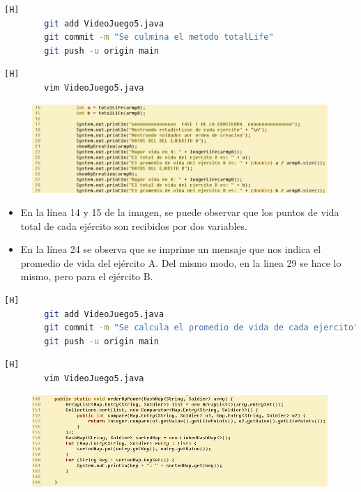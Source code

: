 \documentclass{article}
\begin{document}
	\begin{lstlisting}[language=bash,caption={Commit: 8c68956fc2e3f75c1fd1b3c7bd5919f5b50c9416}][H]
		git add VideoJuego5.java
		git commit -m "Se culmina el metodo totalLife"			
		git push -u origin main
	\end{lstlisting}
	
	
	\begin{lstlisting}[language=bash,caption={Se calcula el promedio de vida de cada ejército}][H]
		vim VideoJuego5.java
	\end{lstlisting}
	
	\begin{figure}[H]
		\centering
		\includegraphics[width=1\textwidth,keepaspectratio]{img/average.jpg}
	\end{figure}
	
	
	\begin{itemize}	
		\item En la línea 14 y 15 de la imagen, se puede observar que los puntos de vida total de cada ejército son recibidos por dos variables.
		\item En la línea 24 se observa que se imprime un mensaje que nos indica el promedio de vida del ejército A. Del mismo modo, en la linea 29 se hace lo mismo, pero para el ejército B.
	\end{itemize}
	
	\begin{lstlisting}[language=bash,caption={Commit: ac8683975133d422bba4e6f0c13a5c378a38e50d}][H]
		git add VideoJuego5.java
		git commit -m "Se calcula el promedio de vida de cada ejercito"			
		git push -u origin main
	\end{lstlisting}	
	
	
	
	\begin{lstlisting}[language=bash,caption={Se modifica el método que imprime el ranking de poder}][H]
		vim VideoJuego5.java
	\end{lstlisting}
	
	\begin{figure}[H]
		\centering
		\includegraphics[width=1\textwidth,keepaspectratio]{img/orderByPower.jpg}
	\end{figure}
	
\end{document}
